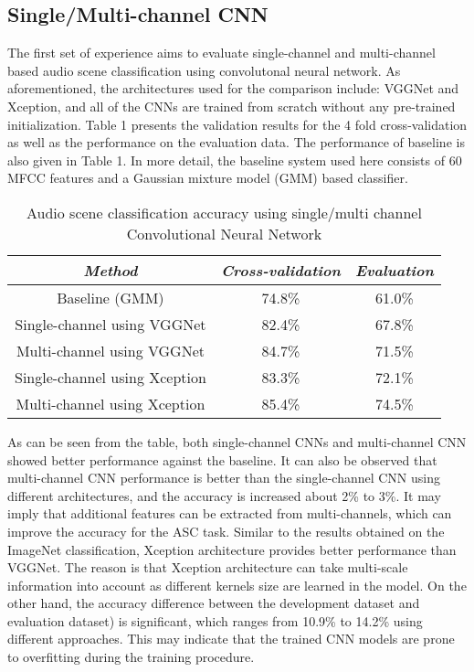 \documentclass[conference]{IEEEtran}
\begin{document}
\subsection{Single/Multi-channel CNN}

The first set of experience aims to evaluate single-channel and multi-channel based audio scene classification using convolutonal neural network. As aforementioned, the architectures used for the comparison include: VGGNet and Xception, and all of the CNNs are trained from scratch without any pre-trained initialization. Table 1 presents the validation results for the 4 fold cross-validation as well as the performance on the evaluation data. The performance of baseline is also given in Table 1. In more detail, the baseline system used here consists of 60 MFCC features and a Gaussian mixture model (GMM) based classifier.
\begin{table}[htbp]
	\caption{Audio scene classification accuracy using single/multi channel Convolutional Neural Network}
	\begin{center}
		\begin{tabular}{|c|c|c|}
			\cline{1-3} 
			\textbf{\textit{Method}}& \textbf{\textit{Cross-validation}}& \textbf{\textit{Evaluation}} \\
			\hline
			Baseline (GMM) & 74.8\%  & 61.0\%  \\
			Single-channel using VGGNet & 82.4\%  & 67.8\%  \\
			Multi-channel using VGGNet & 84.7\%  & 71.5\%  \\
			Single-channel using Xception & 83.3\%  & 72.1\%  \\
			Multi-channel using Xception & 85.4\%  & 74.5\%  \\
			\hline
		\end{tabular}
		\label{tab1}
	\end{center}
\end{table}
As can be seen from the table, both single-channel CNNs and multi-channel CNN showed better performance against the baseline. It can also be observed that multi-channel CNN performance is better than the single-channel CNN using different architectures, and the accuracy is increased about 2\% to 3\%. It may imply that additional features can be extracted from multi-channels, which can improve the accuracy for the ASC task. Similar to the results obtained on the ImageNet classification, Xception architecture provides better performance than VGGNet. The reason is that Xception architecture can take multi-scale information into account as different kernels size are learned in the model.
On the other hand, the accuracy difference between the development dataset and evaluation dataset) is significant, which ranges from 10.9\% to 14.2\% using different approaches. This may indicate that the trained CNN models are prone to overfitting during the training procedure.
\end{document}
